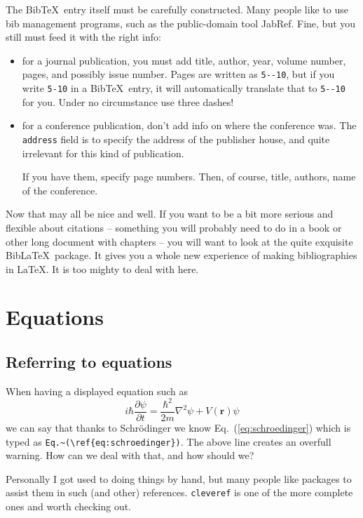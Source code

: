 \documentclass{article}
\begin{document}
The Bib\TeX\ entry itself must be carefully constructed.  Many people like to use bib management programs, such as the public-domain tool JabRef.  Fine, but you still must feed it with the right info:
\begin{itemize}
\item for a journal publication, you must add title, author, year, volume number,
pages, and possibly issue number.  Pages are written as \verb+5--10+, but if you write \verb+5-10+ in a Bib\TeX\ entry, it will automatically translate that to \verb+5--10+ for you.  Under no circumstance use three dashes!

\item for a conference publication, don't add info on where the conference was. The \verb+address+ field is to specify the address of the publisher house, and quite irrelevant for this kind of publication.

If you have them, specify page numbers.  Then, of course, title, authors, name of the  conference.
\end{itemize}
Now that may all be nice and well.  If you want to be a bit more serious and flexible about citations -- something you will probably need to do in a book or other long document with chapters -- you will want to look at the quite exquisite Bib\LaTeX\ package.  It gives you a whole new experience of making bibliographies in \LaTeX.
It is too mighty to deal with here.


\section{Equations}
\subsection{Referring to equations}\label{sec:refereq}
When having a displayed equation such as
\begin{equation}\label{eq:schroedinger}
i\hbar\frac{\partial\psi}{\partial t} = \frac{\hbar^2}{2m}\nabla^2\psi + V(\mathbf{r})\psi
\end{equation}
we can say that thanks to Schr\"odinger we know Eq.~(\ref{eq:schroedinger}) which is typed as \verb+Eq.~(\ref{eq:schroedinger})+.
The above line creates an overfull warning.  How can we deal with that, and how should we?

Personally I got used to doing things by hand, but many people like packages to assist them in such (and other) references.
 \verb+cleveref+  is one of the more complete ones and worth checking out.
\end{document}
